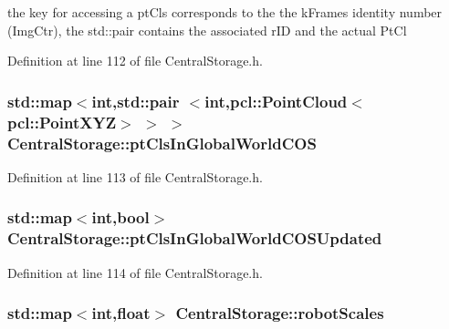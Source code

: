 the key for accessing a pt\-Cls corresponds to the the k\-Frames identity number (\-Img\-Ctr), the std\-::pair contains the associated r\-I\-D and the actual \-Pt\-Cl 



\-Definition at line 112 of file \-Central\-Storage.\-h.

\hypertarget{classCentralStorage_ac162077a92cd58a58d19ae7404719490}{
\subsubsection[{pt\-Cls\-In\-Global\-World\-C\-O\-S}]{\setlength{\rightskip}{0pt plus 5cm}std\-::map$<$int,std\-::pair $<$int,pcl\-::\-Point\-Cloud$<$pcl\-::\-Point\-X\-Y\-Z$>$ $>$ $>$ {\bf \-Central\-Storage\-::pt\-Cls\-In\-Global\-World\-C\-O\-S}}}\label{classCentralStorage_ac162077a92cd58a58d19ae7404719490}


\-Definition at line 113 of file \-Central\-Storage.\-h.

\hypertarget{classCentralStorage_a6b25259119c01d07da15d4e5c9f806f8}{
\subsubsection[{pt\-Cls\-In\-Global\-World\-C\-O\-S\-Updated}]{\setlength{\rightskip}{0pt plus 5cm}std\-::map$<$int,bool$>$ {\bf \-Central\-Storage\-::pt\-Cls\-In\-Global\-World\-C\-O\-S\-Updated}}}\label{classCentralStorage_a6b25259119c01d07da15d4e5c9f806f8}


\-Definition at line 114 of file \-Central\-Storage.\-h.

\hypertarget{classCentralStorage_a017fa3b55ed277d63df2a0937be0ead7}{
\subsubsection[{robot\-Scales}]{\setlength{\rightskip}{0pt plus 5cm}std\-::map$<$int,float$>$ {\bf \-Central\-Storage\-::robot\-Scales}}}\label{classCentralStorage_a017fa3b55ed277d63df2a0937be0ead7}


